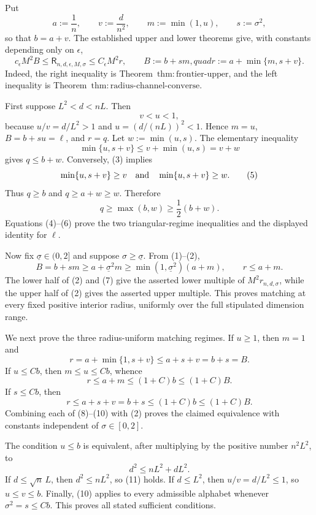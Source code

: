 Put
\[
 a:=\frac1n,\qquad v:=\frac d{n^2},\qquad
 m:=\min(1,u),\qquad s:=\sigma^2,
\tag{1}
\]
so that \(b=a+v\).  The established upper and lower theorems give, with constants depending only on \(\epsilon\),
\[
 c_{\epsilon}M^2 B
 \le \mathsf R_{n,d,\epsilon,M,\sigma}
 \le C_{\epsilon}M^2 r,
\qquad
 B:=b+sm,quad
 r:=a+\min\{m,s+v\}.
\tag{2}
\]
Indeed, the right inequality is Theorem~\(\mathrm{thm:frontier\text{-}upper}\), and the left inequality is Theorem~\(\mathrm{thm:radius\text{-}channel\text{-}converse}\).

First suppose \(L^2<d<nL\).  Then
\[
 v<u<1,
\tag{3}
\]
because \(u/v=d/L^2>1\) and \(u=(d/(nL))^2<1\).  Hence \(m=u\), \(B=b+su=\ell\), and \(r=q\).  Let \(w:=\min(u,s)\).  The elementary inequality
\[
 \min\{u,s+v\}\le v+\min(u,s)=v+w
\tag{4}
\]
gives \(q\le b+w\).  Conversely, (3) implies
\[
 \min\{u,s+v\}\ge v
 \quad\hbox{and}\quad
 \min\{u,s+v\}\ge w.
\tag{5}
\]
Thus \(q\ge b\) and \(q\ge a+w\ge w\).  Therefore
\[
 q\ge\max(b,w)\ge\frac12(b+w).
\tag{6}
\]
Equations (4)--(6) prove the two triangular-regime inequalities and the displayed identity for \(\ell\).

Now fix \(\underline\sigma\in(0,2]\) and suppose \(\sigma\ge\underline\sigma\).  From (1)--(2),
\[
 B=b+sm\ge a+\underline\sigma^2m
 \ge \min(1,\underline\sigma^2)(a+m),
 \qquad r\le a+m.
\tag{7}
\]
The lower half of (2) and (7) give the asserted lower multiple of \(M^2r_{n,d,\sigma}\), while the upper half of (2) gives the asserted upper multiple.  This proves matching at every fixed positive interior radius, uniformly over the full stipulated dimension range.

We next prove the three radius-uniform matching regimes.  If \(u\ge1\), then \(m=1\) and
\[
 r=a+\min\{1,s+v\}\le a+s+v=b+s=B.
\tag{8}
\]
If \(u\le Cb\), then \(m\le u\le Cb\), whence
\[
 r\le a+m\le(1+C)b\le(1+C)B.
\tag{9}
\]
If \(s\le Cb\), then
\[
 r\le a+s+v=b+s\le(1+C)b\le(1+C)B.
\tag{10}
\]
Combining each of (8)--(10) with (2) proves the claimed equivalence with constants independent of \(\sigma\in[0,2]\).

The condition \(u\le b\) is equivalent, after multiplying by the positive number \(n^2L^2\), to
\[
 d^2\le nL^2+dL^2.
\tag{11}
\]
If \(d\le\sqrt n\,L\), then \(d^2\le nL^2\), so (11) holds.  If \(d\le L^2\), then \(u/v=d/L^2\le1\), so \(u\le v\le b\).  Finally, (10) applies to every admissible alphabet whenever \(\sigma^2=s\le Cb\).  This proves all stated sufficient conditions.

